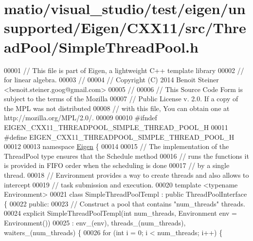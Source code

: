 \hypertarget{matio_2visual__studio_2test_2eigen_2unsupported_2_eigen_2_c_x_x11_2src_2_thread_pool_2_simple_thread_pool_8h_source}{}\section{matio/visual\+\_\+studio/test/eigen/unsupported/\+Eigen/\+C\+X\+X11/src/\+Thread\+Pool/\+Simple\+Thread\+Pool.h}
\label{matio_2visual__studio_2test_2eigen_2unsupported_2_eigen_2_c_x_x11_2src_2_thread_pool_2_simple_thread_pool_8h_source}

\begin{DoxyCode}
00001 \textcolor{comment}{// This file is part of Eigen, a lightweight C++ template library}
00002 \textcolor{comment}{// for linear algebra.}
00003 \textcolor{comment}{//}
00004 \textcolor{comment}{// Copyright (C) 2014 Benoit Steiner <benoit.steiner.goog@gmail.com>}
00005 \textcolor{comment}{//}
00006 \textcolor{comment}{// This Source Code Form is subject to the terms of the Mozilla}
00007 \textcolor{comment}{// Public License v. 2.0. If a copy of the MPL was not distributed}
00008 \textcolor{comment}{// with this file, You can obtain one at http://mozilla.org/MPL/2.0/.}
00009 
00010 \textcolor{preprocessor}{#ifndef EIGEN\_CXX11\_THREADPOOL\_SIMPLE\_THREAD\_POOL\_H}
00011 \textcolor{preprocessor}{#define EIGEN\_CXX11\_THREADPOOL\_SIMPLE\_THREAD\_POOL\_H}
00012 
00013 \textcolor{keyword}{namespace }\hyperlink{namespace_eigen}{Eigen} \{
00014 
00015 \textcolor{comment}{// The implementation of the ThreadPool type ensures that the Schedule method}
00016 \textcolor{comment}{// runs the functions it is provided in FIFO order when the scheduling is done}
00017 \textcolor{comment}{// by a single thread.}
00018 \textcolor{comment}{// Environment provides a way to create threads and also allows to intercept}
00019 \textcolor{comment}{// task submission and execution.}
00020 \textcolor{keyword}{template} <\textcolor{keyword}{typename} Environment>
00021 \textcolor{keyword}{class }SimpleThreadPoolTempl : \textcolor{keyword}{public} ThreadPoolInterface \{
00022  \textcolor{keyword}{public}:
00023   \textcolor{comment}{// Construct a pool that contains "num\_threads" threads.}
00024   \textcolor{keyword}{explicit} SimpleThreadPoolTempl(\textcolor{keywordtype}{int} num\_threads, Environment env = Environment())
00025       : env\_(env), threads\_(num\_threads), waiters\_(num\_threads) \{
00026     \textcolor{keywordflow}{for} (\textcolor{keywordtype}{int} i = 0; i < num\_threads; i++) \{

\end{DoxyCode}
